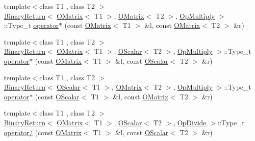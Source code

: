 \begin{DoxyCompactItemize}
\item 
{\footnotesize template$<$class T1 , class T2 $>$ }\\\mbox{\hyperlink{structENSEM_1_1BinaryReturn}{Binary\+Return}}$<$ \mbox{\hyperlink{classENSEM_1_1OMatrix}{O\+Matrix}}$<$ T1 $>$, \mbox{\hyperlink{classENSEM_1_1OMatrix}{O\+Matrix}}$<$ T2 $>$, \mbox{\hyperlink{structENSEM_1_1OpMultiply}{Op\+Multiply}} $>$\+::Type\+\_\+t \mbox{\hyperlink{group__obsmatrix_ga7c6a61b10289159298bd053adf13f1a6}{operator$\ast$}} (const \mbox{\hyperlink{classENSEM_1_1OMatrix}{O\+Matrix}}$<$ T1 $>$ \&l, const \mbox{\hyperlink{classENSEM_1_1OMatrix}{O\+Matrix}}$<$ T2 $>$ \&r)
\item 
{\footnotesize template$<$class T1 , class T2 $>$ }\\\mbox{\hyperlink{structENSEM_1_1BinaryReturn}{Binary\+Return}}$<$ \mbox{\hyperlink{classENSEM_1_1OMatrix}{O\+Matrix}}$<$ T1 $>$, \mbox{\hyperlink{classENSEM_1_1OScalar}{O\+Scalar}}$<$ T2 $>$, \mbox{\hyperlink{structENSEM_1_1OpMultiply}{Op\+Multiply}} $>$\+::Type\+\_\+t \mbox{\hyperlink{group__obsmatrix_gaf5ede60943f488e0a637504e6838529e}{operator$\ast$}} (const \mbox{\hyperlink{classENSEM_1_1OMatrix}{O\+Matrix}}$<$ T1 $>$ \&l, const \mbox{\hyperlink{classENSEM_1_1OScalar}{O\+Scalar}}$<$ T2 $>$ \&r)
\item 
{\footnotesize template$<$class T1 , class T2 $>$ }\\\mbox{\hyperlink{structENSEM_1_1BinaryReturn}{Binary\+Return}}$<$ \mbox{\hyperlink{classENSEM_1_1OScalar}{O\+Scalar}}$<$ T1 $>$, \mbox{\hyperlink{classENSEM_1_1OMatrix}{O\+Matrix}}$<$ T2 $>$, \mbox{\hyperlink{structENSEM_1_1OpMultiply}{Op\+Multiply}} $>$\+::Type\+\_\+t \mbox{\hyperlink{group__obsmatrix_ga92a06278aeac18e092853d6c4cf37b0b}{operator$\ast$}} (const \mbox{\hyperlink{classENSEM_1_1OScalar}{O\+Scalar}}$<$ T1 $>$ \&l, const \mbox{\hyperlink{classENSEM_1_1OMatrix}{O\+Matrix}}$<$ T2 $>$ \&r)
\item 
{\footnotesize template$<$class T1 , class T2 $>$ }\\\mbox{\hyperlink{structENSEM_1_1BinaryReturn}{Binary\+Return}}$<$ \mbox{\hyperlink{classENSEM_1_1OMatrix}{O\+Matrix}}$<$ T1 $>$, \mbox{\hyperlink{classENSEM_1_1OScalar}{O\+Scalar}}$<$ T2 $>$, \mbox{\hyperlink{structENSEM_1_1OpDivide}{Op\+Divide}} $>$\+::Type\+\_\+t \mbox{\hyperlink{group__obsmatrix_gaa90c91fdbe2814bb15f1ac76012585d8}{operator/}} (const \mbox{\hyperlink{classENSEM_1_1OMatrix}{O\+Matrix}}$<$ T1 $>$ \&l, const \mbox{\hyperlink{classENSEM_1_1OScalar}{O\+Scalar}}$<$ T2 $>$ \&r)
\item 

\end{DoxyCompactItemize}
